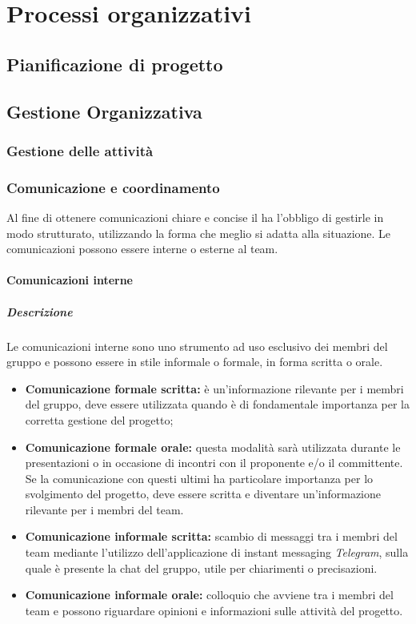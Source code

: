 \newpage

\section{Processi organizzativi}

	\subsection{Pianificazione di progetto}
	
	\subsection{Gestione Organizzativa}
		\subsubsection{Gestione delle attività}
		
		\subsubsection{Comunicazione e coordinamento}
		Al fine di ottenere comunicazioni chiare e concise il \textit{\RdP} ha l'obbligo di gestirle in modo strutturato, utilizzando la forma che meglio si adatta alla situazione. Le comunicazioni possono essere interne o esterne al team.
			
			\paragraph{Comunicazioni interne}
			\subparagraph{Descrizione}
			Le comunicazioni interne sono uno strumento ad uso esclusivo dei membri del gruppo e possono essere in stile informale o formale, in forma scritta o orale. 
				\begin{itemize}
					\item \textbf{Comunicazione formale scritta:} è un'informazione rilevante per i membri del gruppo, deve essere utilizzata quando è di fondamentale importanza per la corretta gestione del progetto;
					\item \textbf{Comunicazione formale orale:} questa modalità sarà utilizzata durante le presentazioni o in occasione di incontri con il proponente e/o il committente. Se la comunicazione con questi ultimi ha particolare importanza per lo svolgimento del progetto, deve essere scritta e diventare un'informazione rilevante per i membri del team.
					\item \textbf{Comunicazione informale scritta:} scambio di messaggi tra i membri del team mediante l'utilizzo dell'applicazione di instant messaging \textit{Telegram}, sulla quale è presente la chat del gruppo, utile per chiarimenti o precisazioni.
					\item \textbf{Comunicazione informale orale:} colloquio che avviene tra i membri del team e possono riguardare opinioni e informazioni sulle attività del progetto. 
				\end{itemize}

